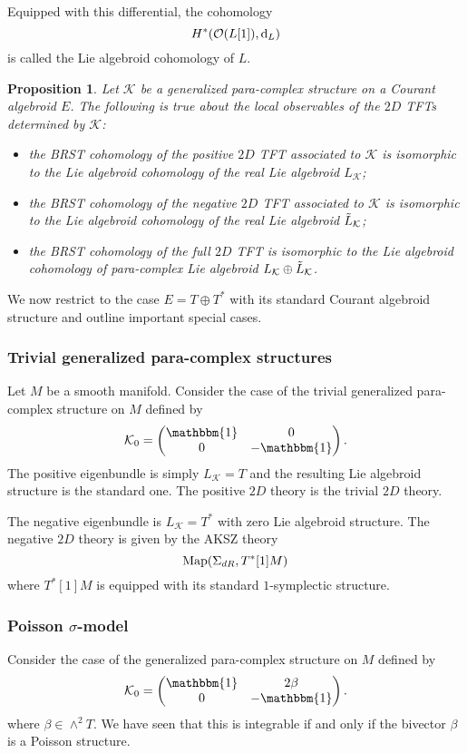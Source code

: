 \documentclass{article}
\newcommand{\TT}{{T\oplus T^*}}
\newcommand{\KK}{\mathcal{K}}
\newcommand{\cO}{\mathcal{O}}
\newcommand{\id}{\mathbbm{1}}
\def\d{{\rm d}}
\newtheorem{proposition}[theorem]{Proposition}
\theoremstyle{definition}
\theoremstyle{remark}
\begin{document}
Equipped with this differential, the cohomology
\[
H^*( \cO(L[1]), \d_L )
\]
is called the Lie algebroid cohomology of $L$.

\begin{proposition}
Let $\KK$ be a generalized para-complex structure on a Courant algebroid $E$.
The following is true about the local observables of the $2D$ TFTs determined by $\KK$:
\begin{itemize}
\item[(1)] the BRST cohomology of the positive $2D$ TFT associated to $\KK$ is isomorphic to the Lie algebroid cohomology of the real Lie algebroid $L_{\KK}$; 
\item[(2)] the BRST cohomology of the negative $2D$ TFT associated to $\KK$ is isomorphic to the Lie algebroid cohomology of the real Lie algebroid $\Tilde{L}_{\KK}$;
\item[(3)] the BRST cohomology of the full $2D$ TFT is isomorphic to the Lie algebroid cohomology of para-complex Lie algebroid $L_{\KK} \oplus \Tilde{L}_{\KK}$.
 \end{itemize}
\end{proposition}

We now restrict to the case $E = \TT$ with its standard Courant algebroid structure and outline important special cases.

\subsubsection*{Trivial generalized para-complex structures}

Let $M$ be a smooth manifold.
Consider the case of the trivial generalized para-complex structure on $M$ defined by
\begin{align*}
\KK_0=
\begin{pmatrix}
\id & 0 \\
0 & -\id
\end{pmatrix}.
\end{align*}
The positive eigenbundle is simply $L_\KK = T$ and the resulting Lie algebroid structure is the standard one.
The positive $2D$ theory is the trivial $2D$ theory.  

The negative eigenbundle is $L_{\KK} = T^*$ with zero Lie algebroid structure.
The negative $2D$ theory is given by the AKSZ theory
\[
{\rm Map}(\Sigma_{dR} , T^*[1] M)
\]
where $T^*[1]M$ is equipped with its standard $1$-symplectic structure. 

\subsubsection*{Poisson $\sigma$-model}
Consider the case of the generalized para-complex structure on $M$ defined by
\begin{align*}
\KK_0=
\begin{pmatrix}
\id & 2 \beta \\
0 & -\id
\end{pmatrix}.
\end{align*}
where $\beta \in \wedge^2 T$.
We have seen that this is integrable if and only if the bivector $\beta$ is a Poisson structure. 
\end{document}
